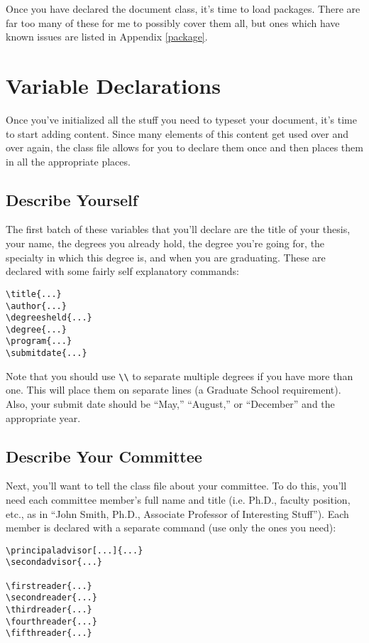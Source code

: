 Once you have declared the document class, it's time to load packages.  There are far too many of these for me to possibly cover them all, but ones which have known issues are listed in Appendix \ref{package}.

\section{Variable Declarations}

Once you've initialized all the stuff you need to typeset your document, it's time to start adding content.  Since many elements of this content get used over and over again, the class file allows for you to declare them once and then places them in all the appropriate places.

\subsection{Describe Yourself}\label{self}
The first batch of these variables that you'll declare are the title of your thesis, your name, the degrees you already hold, the degree you're going for, the specialty in which this degree is, and when you are graduating.  These are declared with some fairly self explanatory commands:

\begin{verbatim}
\title{...}
\author{...}
\degreesheld{...}
\degree{...}
\program{...}
\submitdate{...}
\end{verbatim}

Note that you should use \verb=\\= to separate multiple degrees if you have more than one.  This will place them on separate lines (a Graduate School requirement).  Also, your submit date should be ``May,'' ``August,'' or ``December'' and the appropriate year.

\subsection{Describe Your Committee}\label{comm}
Next, you'll want to tell the class file about your committee.  To do this, you'll need each committee member's full name and title (i.e. Ph.D., faculty position, etc., as in ``John Smith, Ph.D., Associate Professor of Interesting Stuff'').  Each member is declared with a separate command (use only the ones you need):

\begin{verbatim}
\principaladvisor[...]{...}
\secondadvisor{...}

\firstreader{...}
\secondreader{...}
\thirdreader{...}
\fourthreader{...}
\fifthreader{...}
\end{verbatim}

